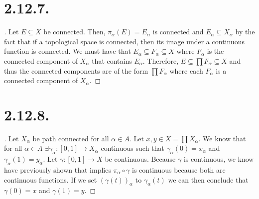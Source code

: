 \documentclass{article}
\begin{document}
\section*{2.12.7.}
\begin{proof}[\unskip\nopunct]
    Let $E \subseteq X$ be connected. Then, $\pi_{\alpha}(E) = E_{\alpha}$ is connected and $E_{\alpha} \subseteq X_{\alpha}$ by 
    the fact that if a topological space is connected, 
    then its image under a continuous function is connected. 
    We must have that $E_{\alpha} \subseteq F_{\alpha} \subseteq X$ where $F_{\alpha}$ is the connected
    component of $X_{\alpha}$ that contains $E_{\alpha}$.
    Therefore, $E \subseteq \prod F_{\alpha} \subseteq X$ and thus the connected components are of the form $\prod F_{\alpha}$ where each $F_{\alpha}$ is a connected component of $X_{\alpha}$. 
    
\end{proof}
\section*{2.12.8.}
\begin{proof}[\unskip\nopunct]
    Let $X_{\alpha}$ be path connected for all $\alpha \in A$. Let $x, y \in X = \prod X_{\alpha}$. We know that for all $\alpha \in A$ $\exists \gamma_{\alpha}:[0, 1] \to X_{\alpha}$ continuous
    such that $\gamma_{\alpha}(0) = x_{\alpha}$ and $\gamma_{\alpha}(1) = y_{\alpha}$. 
    Let $\gamma:[0, 1] \to X$ be continuous. Because $\gamma$ is continuous, 
    we know have previously shown that implies $\pi_{\alpha} \circ \gamma$ is continuous
    because both are continuous functions. 
    If we set $(\gamma(t))_{\alpha}$ to $\gamma_{\alpha}(t)$ 
    we can then conclude that $\gamma(0) = x$ and $\gamma(1) = y$. 
    
\end{proof}
\end{document}
